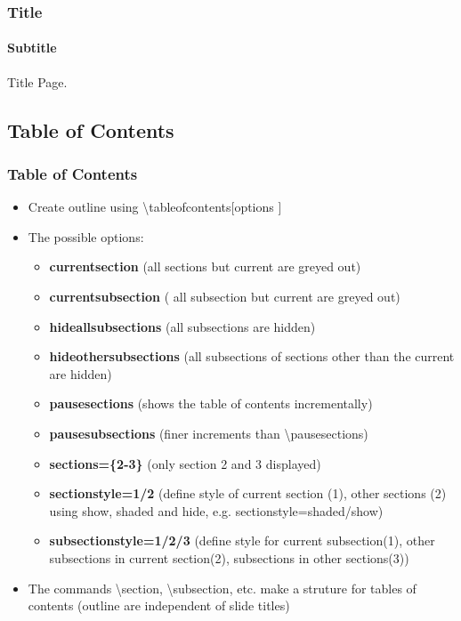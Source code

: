 \documentclass[11pt,pdf,aspectratio=43]{beamer}
\begin{document}
\begin{frame}[c]    %
    \frametitle{Title}
    \framesubtitle{Subtitle}
    \centering
    Title Page.
\end{frame}

\subsection*{Table of Contents}
\begin{frame}
    \frametitle{Table of Contents}
    \begin{itemize}
	\item Create outline using \textbackslash{}tableofcontents[options ]
	\item The possible options:
	    \begin{itemize}
		\item	\textbf{currentsection} (all sections but current are greyed out)
		\item	\textbf{currentsubsection} ( all subsection but current are greyed out)
		\item	\textbf{hideallsubsections} (all subsections are hidden)
		\item	\textbf{hideothersubsections} (all subsections of sections other than the current are hidden)
		\item	\textbf{pausesections} (shows the table of contents incrementally)
		\item	\textbf{pausesubsections} (finer increments than \textbackslash{}pausesections)
		\item	\textbf{sections=\{2-3\}} (only section 2 and 3 displayed)
		\item	\textbf{sectionstyle=1/2}  
			(define style of current section (1), 
			other sections (2) using show, shaded and hide, e.g. sectionstyle=shaded/show)
		\item	\textbf{subsectionstyle=1/2/3}  
			(define style for current subsection(1), 
			other subsections in current section(2), 
			subsections in other sections(3))   
	    \end{itemize}
	\item The commands \textbackslash{}section, \textbackslash{}subsection, etc. make a struture for
	      tables of contents (outline are independent of slide titles)
    \end{itemize}
\end{frame}
\end{document}
